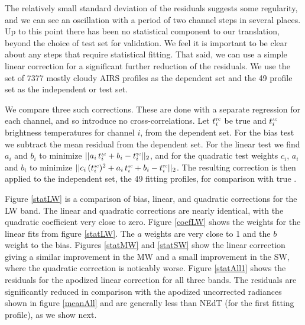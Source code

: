 \documentclass[journal]{IEEEtran}
\begin{document}


The relatively small standard deviation of the residuals suggests
some regularity, and we can see an oscillation with a period of two
channel steps in several places.  Up to this point there has been no
statistical component to our translation, beyond the choice of test
set for validation.  We feel it is important to be clear about any
steps that require statistical fitting.  That said, we can use a
simple linear correction for a significant further reduction of the
residuals.  We use the set of 7377 mostly cloudy AIRS profiles as
the dependent set and the 49 profile set as the independent or test
set.

We compare three such corrections.  These are done with a separate
regression for each {\cris} channel, and so introduce no
cross-correlations.  Let $t^{\mbox{\tiny\textsc{tc}}}_i$ be true {\cris} and $t^{\mbox{\tiny\textsc{ac}}}_i$
{\airs} {\cris} brightness temperatures for {\cris} channel $i$,
from the dependent set.  For the bias test we subtract the mean
residual from the dependent set.  For the linear test we find $a_i$
and $b_i$ to minimize $||a_i\,t^{\mbox{\tiny\textsc{ac}}}_i + b_i - t^{\mbox{\tiny\textsc{tc}}}_i||_2$, and for
the quadratic test weights $c_i$, $a_i$ and $b_i$ to minimize
$||c_i\,(t^{\mbox{\tiny\textsc{ac}}}_i)^2 + a_i\,t^{\mbox{\tiny\textsc{ac}}}_i + b_i - t^{\mbox{\tiny\textsc{tc}}}_i||_2$.  The resulting
correction is then applied to the independent set, the 49 fitting
profiles, for comparison with true {\cris}.

Figure \ref{statLW} is a comparison of bias, linear, and quadratic
corrections for the LW band.  The linear and quadratic corrections
are nearly identical, with the quadratic coefficient very close to
zero.  Figure \ref{coefLW} shows the weights for the linear fits
from figure \ref{statLW}.  The $a$ weights are very close to 1 and
the $b$ weight to the bias.  Figures \ref{statMW} and \ref{statSW}
show the linear correction giving a similar improvement in the MW
and a small improvement in the SW, where the quadratic correction is
noticably worse.  Figure \ref{statAll1} shows the residuals for the
apodized linear correction for all three bands.  The residuals are
significantly reduced in comparison with the apodized uncorrected
radiances shown in figure \ref{meanAll} and are generally less than
NEdT (for the first fitting profile), as we show next.
\end{document}
